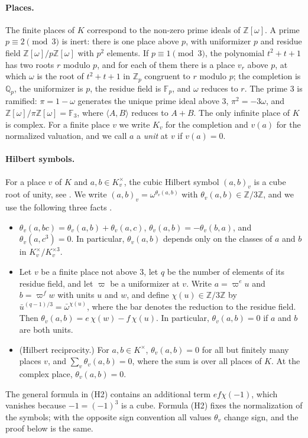 \documentclass[11pt]{article}
\newcommand{\Z}{\mathbb{Z}}
\newcommand{\Q}{\mathbb{Q}}
\newcommand{\F}{\mathbb{F}}
\begin{document}
\paragraph{Places.} The finite places of $K$ correspond to the non-zero prime ideals of $\Z[\omega]$. A prime $p\equiv2\pmod3$ is inert: there is one place above $p$, with uniformizer $p$ and residue field $\Z[\omega]/p\Z[\omega]$ with $p^2$ elements. If $p\equiv1\pmod3$, the polynomial $t^2+t+1$ has two roots $r$ modulo $p$, and for each of them there is a place $v_r$ above $p$, at which $\omega$ is the root of $t^2+t+1$ in $\Z_p$ congruent to $r$ modulo $p$; the completion is $\Q_p$, the uniformizer is $p$, the residue field is $\F_p$, and $\omega$ reduces to $r$. The prime $3$ is ramified: $\pi=1-\omega$ generates the unique prime ideal above $3$, $\pi^2=-3\omega$, and $\Z[\omega]/\pi\Z[\omega]=\F_3$, where $\langle A,B\rangle$ reduces to $A+B$. The only infinite place of $K$ is complex. For a finite place $v$ we write $K_v$ for the completion and $v(a)$ for the normalized valuation, and we call $a$ a \emph{unit} at $v$ if $v(a)=0$.

\paragraph{Hilbert symbols.} For a place $v$ of $K$ and $a,b\in K_v^\times$, the cubic Hilbert symbol $(a,b)_v$ is a cube root of unity, see \cite[Chapter~V, \S3]{N}. We write $(a,b)_v=\omega^{\theta_v(a,b)}$ with $\theta_v(a,b)\in\Z/3\Z$, and we use the following three facts \cite[Chapter~V, \S3 and Chapter~VI, \S8]{N}.
\begin{itemize}
\item[(H1)] $\theta_v(a,bc)=\theta_v(a,b)+\theta_v(a,c)$, $\theta_v(a,b)=-\theta_v(b,a)$, and $\theta_v(a,c^3)=0$. In particular, $\theta_v(a,b)$ depends only on the classes of $a$ and $b$ in $K_v^\times/K_v^{\times3}$.
\item[(H2)] Let $v$ be a finite place not above $3$, let $q$ be the number of elements of its residue field, and let $\varpi$ be a uniformizer at $v$. Write $a=\varpi^eu$ and $b=\varpi^fw$ with units $u$ and $w$, and define $\chi(u)\in\Z/3\Z$ by $\bar u^{(q-1)/3}=\bar\omega^{\chi(u)}$, where the bar denotes the reduction to the residue field. Then $\theta_v(a,b)=e\,\chi(w)-f\,\chi(u)$. In particular, $\theta_v(a,b)=0$ if $a$ and $b$ are both units.
\item[(H3)] (Hilbert reciprocity.) For $a,b\in K^\times$, $\theta_v(a,b)=0$ for all but finitely many places $v$, and $\sum_v\theta_v(a,b)=0$, where the sum is over all places of $K$. At the complex place, $\theta_v(a,b)=0$.
\end{itemize}
The general formula in (H2) contains an additional term $ef\chi(-1)$, which vanishes because $-1=(-1)^3$ is a cube. Formula (H2) fixes the normalization of the symbols; with the opposite sign convention all values $\theta_v$ change sign, and the proof below is the same.
\end{document}
